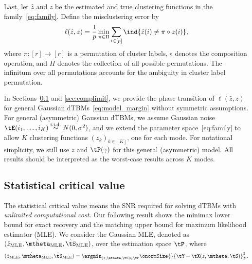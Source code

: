 \documentclass[lettersize,onecolumn,journal]{IEEEtran}
\theoremstyle{definition}
\theoremstyle{definition}
\begin{document}
Last, let $\hat z$ and $z$ be the estimated and true clustering functions in the family~\eqref{eq:family}. Define the misclustering error by
\[
\ell(\hat z, z)={1\over p}\min_{\pi \in \Pi}\sum_{i\in[p]}\ind\{\hat z(i)\neq \pi \circ z(i)\},
\]
where $\pi: [r] \mapsto [r]$ is a permutation of cluster labels, $\circ$ denotes the composition operation, and $\Pi$ denotes the collection of all possible permutations. The infinitum over all permutations accounts for the ambiguity in cluster label permutation. 

In Sections~\ref{sec:statlimit} and \ref{sec:complimit}, we provide the phase transition of $\ell (\hat z, z)$ for general Gaussian dTBMs~\eqref{eq:model_margin} without symmetric assumptions. For general (asymmetric) Gaussian dTBMs, we assume Gaussian noise $\tE(i_1,\ldots,i_K)\stackrel{\text{i.i.d.}}{\sim} N(0,\sigma^2)$, and we extend the parameter space~\eqref{eq:family} to allow $K$ clustering functions $(z_k)_{k\in[K]}$, one for each mode. For notational simplicity, we still use $z$ and $\tP(\gamma)$ for this general (asymmetric) model. All results should be interpreted as the worst-case results across $K$ modes. 


\subsection{Statistical critical value}\label{sec:statlimit}
The statistical critical value means the SNR required for solving dTBMs with \emph{unlimited computational cost.}   {Our following result shows the minimax lower bound for exact recovery and the matching upper bound for maximum likelihood estimator (MLE). }
{
\color{blue}
  We consider the Gaussian MLE, denoted as $(\hat z_{\text{MLE}}, \hat \mtheta_{\text{MLE}}, \hat \tS_{\text{MLE}})$, over the estimation space $\tP$, where 
\begin{equation}\label{eq:mle}
    (\hat z_{\text{MLE}}, \hat \mtheta_{\text{MLE}}, \hat \tS_{\text{MLE}}) = \argmin_{ (z, \mtheta, \tS) \in \tP} \onormSize{}{\tY - \tX(z,\mtheta, \tS)}_F^2.
\end{equation}
}
\end{document}
